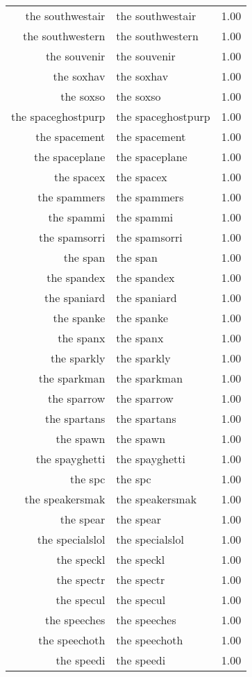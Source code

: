 \begin{table}[ht]
\begin{tabular}{rlr}
  the southwestair & the southwestair & 1.00 \\ 
  the southwestern & the southwestern & 1.00 \\ 
  the souvenir & the souvenir & 1.00 \\ 
  the soxhav & the soxhav & 1.00 \\ 
  the soxso & the soxso & 1.00 \\ 
  the spaceghostpurp & the spaceghostpurp & 1.00 \\ 
  the spacement & the spacement & 1.00 \\ 
  the spaceplane & the spaceplane & 1.00 \\ 
  the spacex & the spacex & 1.00 \\ 
  the spammers & the spammers & 1.00 \\ 
  the spammi & the spammi & 1.00 \\ 
  the spamsorri & the spamsorri & 1.00 \\ 
  the span & the span & 1.00 \\ 
  the spandex & the spandex & 1.00 \\ 
  the spaniard & the spaniard & 1.00 \\ 
  the spanke & the spanke & 1.00 \\ 
  the spanx & the spanx & 1.00 \\ 
  the sparkly & the sparkly & 1.00 \\ 
  the sparkman & the sparkman & 1.00 \\ 
  the sparrow & the sparrow & 1.00 \\ 
  the spartans & the spartans & 1.00 \\ 
  the spawn & the spawn & 1.00 \\ 
  the spayghetti & the spayghetti & 1.00 \\ 
  the spc & the spc & 1.00 \\ 
  the speakersmak & the speakersmak & 1.00 \\ 
  the spear & the spear & 1.00 \\ 
  the specialslol & the specialslol & 1.00 \\ 
  the speckl & the speckl & 1.00 \\ 
  the spectr & the spectr & 1.00 \\ 
  the specul & the specul & 1.00 \\ 
  the speeches & the speeches & 1.00 \\ 
  the speechoth & the speechoth & 1.00 \\ 
  the speedi & the speedi & 1.00 \\ 

\end{tabular}
\end{table}
